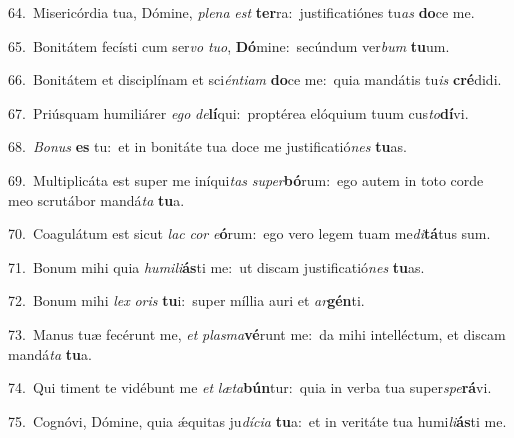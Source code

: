 {\numbfont\textcolor{\numbcolor}{64.}}~Misericórdia tua, Dómine, \textit{ple}\-\textit{na} \textit{est} \textbf{ter}\-ra:~\star justificatiónes tu\textit{as} \textbf{do}\-ce me.\par
{\numbfont\textcolor{\numbcolor}{65.}}~Bonitátem fecísti cum ser\textit{vo} \textit{tu}\-\textit{o}, \textbf{Dó}\-mine:~\star secúndum ver\textit{bum} \textbf{tu}\-um.\par
{\numbfont\textcolor{\numbcolor}{66.}}~Bonitátem et disciplínam et sci\-\textit{én}\-\textit{ti}\textit{am} \textbf{do}\-ce me:~\star quia mandátis tu\textit{is} \textbf{cré}\-didi.\par
{\numbfont\textcolor{\numbcolor}{67.}}~Priúsquam humiliárer \textit{e}\-\textit{go} \textit{de}\-\textbf{lí}qui:~\star proptérea elóquium tuum cus\-\textit{to}\-\textbf{dí}vi.\par
{\numbfont\textcolor{\numbcolor}{68.}}~\-\textit{Bo}\-\textit{nus} \textbf{es} tu:~\star et in bonitáte tua doce me justificatió\textit{nes} \textbf{tu}\-as.\par
{\numbfont\textcolor{\numbcolor}{69.}}~Multiplicáta est super me iníqui\textit{tas} \textit{su}\-\textit{per}\textbf{bó}rum:~\star ego autem in toto corde meo scrutábor mandá\textit{ta} \textbf{tu}\-a.\par
{\numbfont\textcolor{\numbcolor}{70.}}~Coagulátum est sicut \textit{lac} \textit{cor} \textit{e}\-\textbf{ó}rum:~\star ego vero legem tuam me\-\textit{di}\-\textbf{tá}tus sum.\par
{\numbfont\textcolor{\numbcolor}{71.}}~Bonum mihi quia \textit{hu}\-\textit{mi}\textit{li}\textbf{ás}ti me:~\star ut discam justificatió\textit{nes} \textbf{tu}\-as.\par
{\numbfont\textcolor{\numbcolor}{72.}}~Bonum mihi \textit{lex} \textit{o}\-\textit{ris} \textbf{tu}\-i:~\star super míllia auri et \textit{ar}\-\textbf{gén}ti.\par
{\numbfont\textcolor{\numbcolor}{73.}}~Manus tuæ fecérunt me, \textit{et} \textit{plas}\-\textit{ma}\textbf{vé}runt me:~\star da mihi intelléctum, et discam mandá\textit{ta} \textbf{tu}\-a.\par
{\numbfont\textcolor{\numbcolor}{74.}}~Qui timent te vidébunt me \textit{et} \textit{læ}\-\textit{ta}\textbf{bún}tur:~\star quia in verba tua super\-\textit{spe}\-\textbf{rá}vi.\par
{\numbfont\textcolor{\numbcolor}{75.}}~Cognóvi, Dómine, quia ǽquitas ju\-\textit{dí}\-\textit{ci}\textit{a} \textbf{tu}\-a:~\star et in veritáte tua humi\-\textit{li}\-\textbf{ás}ti me.\par
